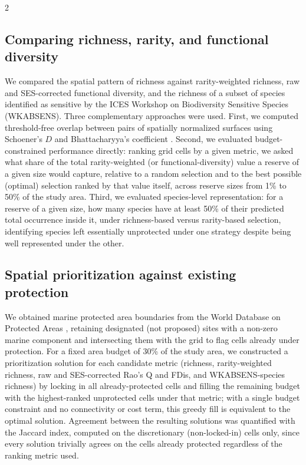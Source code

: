 \begin{spacing}{2}
\subsection{Comparing richness, rarity, and functional diversity}
We compared the spatial pattern of richness against rarity-weighted richness, raw and SES-corrected functional diversity, and the richness of a subset of species identified as sensitive by the ICES Workshop on Biodiversity Sensitive Species (WKABSENS). Three complementary approaches were used. First, we computed threshold-free overlap between pairs of spatially normalized surfaces using Schoener's $D$ \citep{schoenerNonsynchronousSpatialOverlap1970} and Bhattacharyya's coefficient \citep{bhattacharyyaMeasureDivergence1943}. Second, we evaluated budget-constrained performance directly: ranking grid cells by a given metric, we asked what share of the total rarity-weighted (or functional-diversity) value a reserve of a given size would capture, relative to a random selection and to the best possible (optimal) selection ranked by that value itself, across reserve sizes from 1\% to 50\% of the study area. Third, we evaluated species-level representation: for a reserve of a given size, how many species have at least 50\% of their predicted total occurrence inside it, under richness-based versus rarity-based selection, identifying species left essentially unprotected under one strategy despite being well represented under the other.

\subsection{Spatial prioritization against existing protection}
We obtained marine protected area boundaries from the World Database on Protected Areas \citep{unepwcmcProtectedPlanet2026}, retaining designated (not proposed) sites with a non-zero marine component and intersecting them with the grid to flag cells already under protection. For a fixed area budget of 30\% of the study area, we constructed a prioritization solution for each candidate metric (richness, rarity-weighted richness, raw and SES-corrected Rao's Q and FDis, and WKABSENS-species richness) by locking in all already-protected cells and filling the remaining budget with the highest-ranked unprotected cells under that metric; with a single budget constraint and no connectivity or cost term, this greedy fill is equivalent to the optimal solution. Agreement between the resulting solutions was quantified with the Jaccard index, computed on the discretionary (non-locked-in) cells only, since every solution trivially agrees on the cells already protected regardless of the ranking metric used.


\end{spacing}
